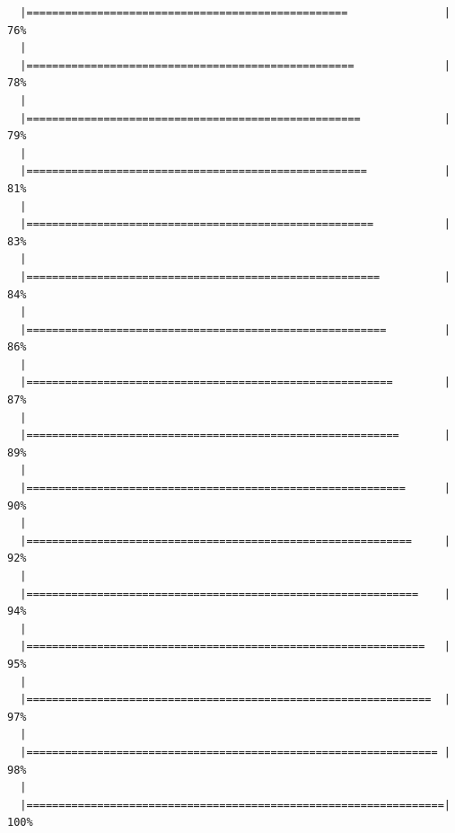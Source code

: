 \documentclass[]{book}
\newenvironment{Shaded}{\begin{snugshade}}{\end{snugshade}}
\newcommand{\CommentTok}[1]{\textcolor[rgb]{0.56,0.35,0.01}{\textit{#1}}}
\begin{document}
\begin{verbatim}
  |==================================================               |  76%
  |                                                                       
  |===================================================              |  78%
  |                                                                       
  |====================================================             |  79%
  |                                                                       
  |=====================================================            |  81%
  |                                                                       
  |======================================================           |  83%
  |                                                                       
  |=======================================================          |  84%
  |                                                                       
  |========================================================         |  86%
  |                                                                       
  |=========================================================        |  87%
  |                                                                       
  |==========================================================       |  89%
  |                                                                       
  |===========================================================      |  90%
  |                                                                       
  |============================================================     |  92%
  |                                                                       
  |=============================================================    |  94%
  |                                                                       
  |==============================================================   |  95%
  |                                                                       
  |===============================================================  |  97%
  |                                                                       
  |================================================================ |  98%
  |                                                                       
  |=================================================================| 100%
\end{verbatim}

\begin{Shaded}
\end{Shaded}
\end{document}
